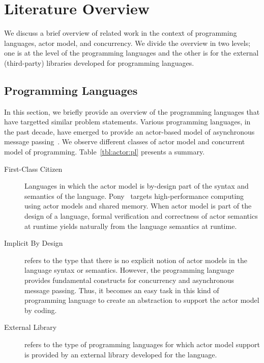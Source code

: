 \section{Literature Overview}
\label{sec:intro:rel}

We discuss a brief overview of related work in the context of programming languages, actor model, and concurrency.
We divide the overview in two levels; one is at the level of the programming languages and the other is for the external (third-party) libraries developed for programming languages.

\subsection{Programming Languages}
\label{sec:intro:proglangs}

In this section, we briefly provide an overview of the programming languages that have targetted similar problem statements.
Various programming languages, in the past decade, have emerged to provide an actor-based model of asynchronous message passing~\cite{philippsen2000survey}.
We observe different classes of actor model and concurrent model of 
programming.
Table~\ref{tbl:actor:pl} presents a summary.

\begin{description}
\item[First-Class Citizen]
Languages in which the actor model is by-design part of the syntax and 
semantics of the language.
Pony~\cite{ponylang,ClebschD13} targets high-performance 
computing using actor models and shared memory. 
When actor model is part of the design of a language, formal verification
and correctness of actor semantics at runtime yields naturally from the 
language semantics at runtime.
\item[Implicit By Design]
refers to the type that there is no explicit notion of actor models in the language syntax or semantics.
However, the programming language provides fundamental constructs for concurrency and asynchronous message passing.
Thus, it becomes an easy task in this kind of programming language to create an abstraction to support the actor model by coding.
\item[External Library]
refers to the type of programming languages for which actor model support is provided by an external library developed for the language.
\end{description}


